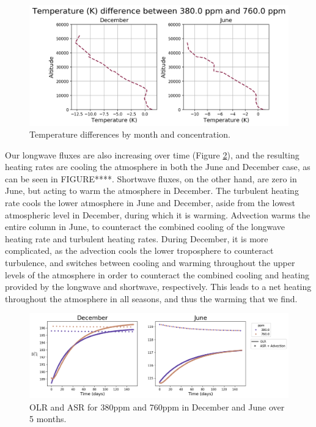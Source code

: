 \documentclass[12]{article}
\begin{document}
\begin{figure}[htb!]
\noindent\includegraphics[width=.8\textwidth]{figures/temp_evolution.png}
\centering
\caption{Temperature differences by month and  concentration.}
\label{fig:temp_step}
\end{figure}
Our longwave fluxes are also increasing over time (Figure \ref{fig:ASR_OLR}), and the resulting heating rates are cooling the atmosphere in both the June and December case, as can be seen in FIGURE****. Shortwave fluxes, on the other hand, are zero in June, but acting to warm the atmosphere in December. The turbulent heating rate cools the lower atmosphere in June and December, aside from the lowest atmospheric level in December, during which it is warming. Advection warms the entire column in June, to counteract the combined cooling of the longwave heating rate and turbulent heating rates. During December, it is more complicated, as the advection cools the lower troposphere to counteract turbulence, and switches between cooling and warming throughout the upper levels of the atmosphere in order to counteract the combined cooling and heating provided by the longwave and shortwave, respectively. This leads to a net heating throughout the atmosphere in all seasons, and thus the warming that we find.

\begin{figure}[htb!]
\noindent\includegraphics[width=1\textwidth]{figures/ASR_OLR.png}
\centering
\caption{OLR and ASR for 380ppm and 760ppm in December and June over 5 months.}
\label{fig:ASR_OLR}
\end{figure}
\end{document}
